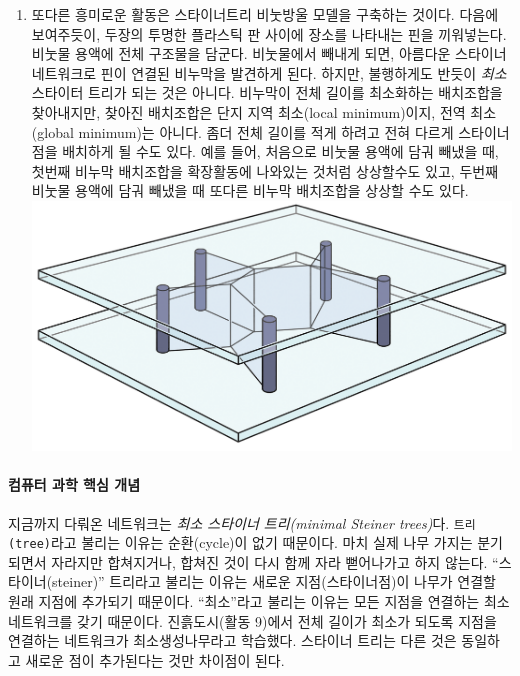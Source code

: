 \documentclass[]{article}
\begin{document}
\begin{enumerate}
\itemsep1pt\parskip0pt
\item
  또다른 흥미로운 활동은 스타이너트리 비눗방울 모델을 구축하는 것이다.
  다음에 보여주듯이, 두장의 투명한 플라스틱 판 사이에 장소를 나타내는
  핀을 끼워넣는다. 비눗물 용액에 전체 구조물을 담군다. 비눗물에서 빼내게
  되면, 아름다운 스타이너 네트워크로 핀이 연결된 비누막을 발견하게 된다.
  하지만, 불행하게도 반듯이 \emph{최소} 스타이터 트리가 되는 것은
  아니다. 비누막이 전체 길이를 최소화하는 배치조합을 찾아내지만, 찾아진
  배치조합은 단지 지역 최소(local minimum)이지, 전역 최소(global
  minimum)는 아니다. 좀더 전체 길이를 적게 하려고 전혀 다르게
  스타이너점을 배치하게 될 수도 있다. 예를 들어, 처음으로 비눗물 용액에
  담궈 빼냈을 때, 첫번째 비누막 배치조합을 확장활동에 나와있는 것처럼
  상상할수도 있고, 두번째 비눗물 용액에 담궈 빼냈을 때 또다른 비누막
  배치조합을 상상할 수도 있다.
  \includegraphics{csunplugged/04-part/img/ch16-steiner/15-steiner-09-soap-solution.png}
\end{enumerate}

\mbox{}\paragraph{컴퓨터 과학 핵심 개념}\label{section-220}

지금까지 다뤄온 네트워크는 \emph{최소 스타이너 트리(minimal Steiner
trees)}다. \texttt{트리(tree)}라고 불리는 이유는 순환(cycle)이 없기
때문이다. 마치 실제 나무 가지는 분기되면서 자라지만 합쳐지거나, 합쳐진
것이 다시 함께 자라 뻗어나가고 하지 않는다. ``스타이너(steiner)''
트리라고 불리는 이유는 새로운 지점(스타이너점)이 나무가 연결할 원래
지점에 추가되기 때문이다. ``최소''라고 불리는 이유는 모든 지점을
연결하는 최소 네트워크를 갖기 때문이다. 진흙도시(활동 9)에서 전체 길이가
최소가 되도록 지점을 연결하는 네트워크가 최소생성나무라고 학습했다.
스타이너 트리는 다른 것은 동일하고 새로운 점이 추가된다는 것만 차이점이
된다.
\end{document}
